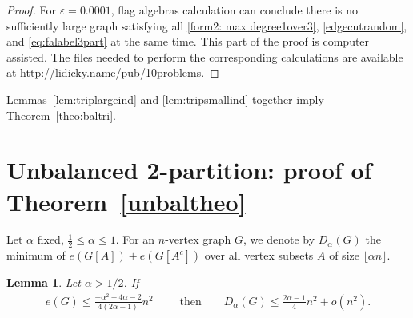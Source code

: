 \documentclass[11pt]{article}
\newtheorem{lemma}[theo]{Lemma}
\theoremstyle{definition}
\numberwithin{theo}{section}
\newcommand{\oururl}{\url{http://lidicky.name/pub/10problems}}
\begin{document}
\begin{proof}
For $\varepsilon = 0.0001$, flag algebras calculation can conclude there is no sufficiently large graph satisfying all  \eqref{form2: max degree1over3}, \eqref{edgecutrandom}, and \eqref{eq:falabel3part} at the same time.
This part of the proof is computer assisted. The files needed to perform the corresponding calculations are available at \oururl. 
\end{proof}
Lemmas~\ref{lem:triplargeind} and \ref{lem:tripsmallind} together imply Theorem~\ref{theo:baltri}.






\section{Unbalanced 2-partition: proof of Theorem~\ref{unbaltheo}}
\label{sec:theounb}
Let $\alpha$ fixed, $\frac{1}{2}\leq \alpha\leq 1$. For an $n$-vertex graph $G$, we denote by $D_\alpha(G)$ the minimum of $e(G[A])+e(G[A^c])$ over all vertex subsets $A$ of size $\lfloor\alpha n\rfloor$. 
\begin{lemma}
\label{unbalrandomcut}
Let $\alpha> 1/2$. If
\begin{align*}
    e(G)\leq\frac{-\alpha^2+4\alpha-2}{4(2\alpha-1)}n^2 \quad \quad \text{ then} \quad \quad
    D_\alpha(G)\leq \frac{2\alpha- 1}{4}n^2+o(n^2).
\end{align*}
\end{lemma}
\end{document}
